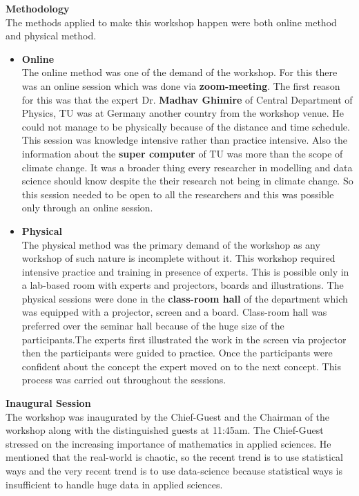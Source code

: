 \documentclass[a4paper,12pt]{report}
\begin{document}
 \vspace*{1cm}
{\Large \textbf{Methodology}}\\[5mm]
The methods applied to make this workshop happen were both online method and physical method.
\vspace{2mm}
\begin{itemize}
\item \textbf{Online}\\[2mm]
  The online method was one of the demand of the workshop. For this there was an online session which was done via \textbf{zoom-meeting}. The first reason for this was that the expert Dr. \textbf{Madhav Ghimire} of Central Department of Physics, TU was at Germany another country from the workshop venue. He could not manage to be physically because of the distance and time schedule.   This session was knowledge intensive rather than practice intensive. Also the information about the \textbf{super computer} of TU was more than the scope of climate change. It was a broader thing every researcher in modelling and data science should know despite the their research not being in climate change. So this session needed to be open to all the researchers and this was possible only through an online session. \vspace{3cm}

\item \textbf{Physical}\\[2mm]
  The physical method was the primary demand of the workshop as any workshop of such nature is incomplete without it. This workshop required intensive practice and training in presence of experts. This is possible only in a lab-based room with experts and projectors, boards and illustrations. The physical sessions were done in the \textbf{class-room hall} of the department which was equipped with a projector, screen and a board. Class-room hall was preferred over the seminar hall because of the huge size of the participants.The experts first illustrated the work in the screen via projector then the participants were guided to practice. Once the participants were confident about the concept the expert moved on to the next concept. This process was carried out throughout the sessions.
\end{itemize}
\clearpage

{\bfseries \Large Inaugural Session}\\[3mm]
The workshop was inaugurated by the Chief-Guest and the Chairman of the workshop along with the distinguished guests at 11:45am. The Chief-Guest stressed on the increasing importance of mathematics in applied sciences. He mentioned that the real-world is chaotic, so the recent trend is to use statistical ways and the very recent trend is to use data-science because statistical ways is insufficient to handle huge data in applied sciences.
\end{document}
